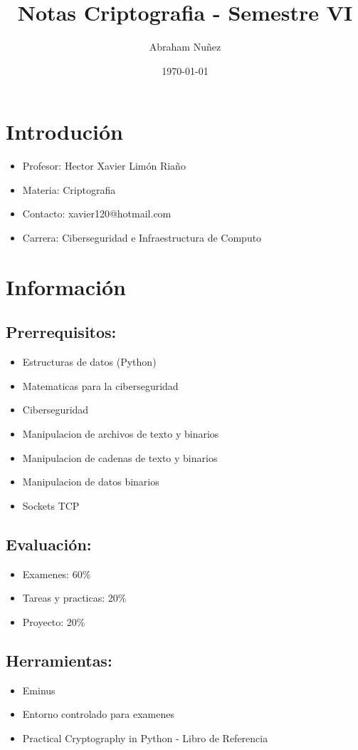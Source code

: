 \documentclass[11pt]{article}
\author{Abraham Nuñez}
\date{\today}
\title{Notas Criptografia - Semestre VI}
\begin{document}
\maketitle
\tableofcontents

\section{Introdución}
\label{sec:orga6bb0a6}
\begin{itemize}
\item Profesor: Hector Xavier Limón Riaño
\item Materia: Criptografia
\item Contacto: xavier120@hotmail.com
\item Carrera: Ciberseguridad e Infraestructura de Computo
\end{itemize}
\section{Información}
\label{sec:orga249e15}
\subsection{Prerrequisitos:}
\label{sec:org65fccbb}
\begin{itemize}
\item Estructuras de datos (Python)
\item Matematicas para la ciberseguridad
\item Ciberseguridad
\item Manipulacion de archivos de texto y binarios
\item Manipulacion de cadenas de texto y binarios
\item Manipulacion de datos binarios
\item Sockets TCP
\end{itemize}
\subsection{Evaluación:}
\label{sec:orgccf30b8}
\begin{itemize}
\item Examenes: 60\%
\item Tareas y practicas: 20\%
\item Proyecto: 20\%
\end{itemize}
\subsection{Herramientas:}
\label{sec:org1a09a7b}
\begin{itemize}
\item Eminus
\item Entorno controlado para examenes
\item Practical Cryptography in Python - Libro de Referencia
\end{itemize}
\end{document}
